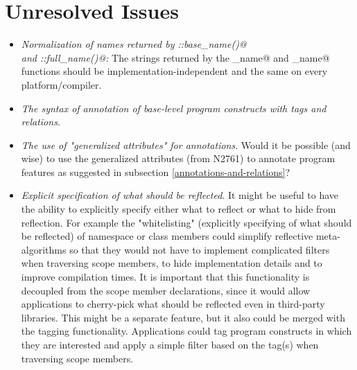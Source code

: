 \section{Unresolved Issues}
\label{section-issues}

\begin{itemize}
	\item {\em Normalization of names returned by \verb@Named::base_name()@\\and \verb@NamedScoped::full_name()@:}
	The strings returned by the \verb@base_name@ and \verb@full_name@ functions should be
	implementation-independent and the same on every platform/compiler.

	\item {\em The syntax of annotation of base-level program constructs with tags and relations}.

	\item {\em The use of "generalized attributes" for annotations}. Would it be possible
	(and wise) to use the generalized attributes (from N2761) to annotate program features
	as suggested in subsection \ref{annotations-and-relations}?

	\item {\em Explicit specification of what should be reflected}. It might be useful to have
	the ability to explicitly specify either what to reflect or what to hide from reflection.
	For example the "whitelisting" (explicitly specifying of what should be reflected) of namespace
	or class members could simplify reflective meta-algorithms so that they would not have
	to implement complicated filters when traversing scope members, to hide implementation details and
	to improve compilation times. It is important that this functionality is decoupled from the
	scope member declarations, since it would allow applications to cherry-pick what should be
	reflected even in third-party libraries.
	This might be a separate feature, but it also could be merged with the tagging functionality.
	Applications could tag program constructs in which they are interested and apply a simple
	filter based on the tag(s) when traversing scope members.
\end{itemize}
